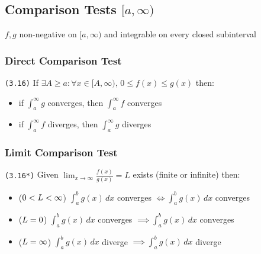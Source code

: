 \documentclass[a4paper,landscape]{article}
\newcommand{\tnum}[1]{{\color{gray}\footnotesize\texttt{(#1)}}}
\begin{document}
\begin{multicols}{2}
\section{Comparison Tests $[a,\infty)$}

$f,g$ non-negative on $[a,\infty)$ and integrable on every closed subinterval

\subsubsection{Direct Comparison Test}
\tnum{3.16} If $\exists A\geq a:\forall x\in[A,\infty),\,0\leq f(x)\leq g(x)$ then:

\begin{itemize}
    \item if $\int ^\infty_{a} g$ converges, then $\int ^\infty_{a} f$ converges
    \item if $\int ^\infty_{a} f$ diverges, then $\int ^\infty_{a} g$ diverges
\end{itemize}

\subsubsection{Limit Comparison Test}

\tnum{3.16*} Given $\displaystyle\lim_{ x \to \infty }\frac{f(x)}{g(x)}=L$ exists (finite or infinite) then:

\begin{itemize}
    \item ($\small 0<L<\infty$) $\int ^b_{a}g(x) \, dx$ converges  $\iff\int ^b_{a}g(x) \, dx$ converges
    \item ($\small L=0$) $\int ^b_{a}g(x) \, dx$ converges $\implies\int ^b_{a}g(x) \, dx$ converges
    \item ($\small L=\infty$) $\int ^b_{a}g(x) \, dx$ diverge $\implies\int ^b_{a}g(x) \, dx$ diverge
\end{itemize}

\end{multicols}
\end{document}
